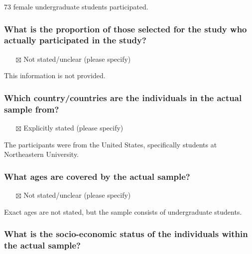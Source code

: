 \documentclass[
  doc, a4paper]{apa7}
\providecommand{\tightlist}{%
  \setlength{\itemsep}{0pt}\setlength{\parskip}{0pt}}
\begin{document}
73 female undergraduate students participated.

\subsubsection{What is the proportion of those selected for the study who actually participated in the study?}\label{what-is-the-proportion-of-those-selected-for-the-study-who-actually-participated-in-the-study}

\begin{itemize}
\tightlist
\item[$\boxtimes$]
  Not stated/unclear (please specify)
\end{itemize}

This information is not provided.

\subsubsection{Which country/countries are the individuals in the actual sample from?}\label{which-countrycountries-are-the-individuals-in-the-actual-sample-from}

\begin{itemize}
\tightlist
\item[$\boxtimes$]
  Explicitly stated (please specify)
\end{itemize}

The participants were from the United States, specifically students at Northeastern University.

\subsubsection{What ages are covered by the actual sample?}\label{what-ages-are-covered-by-the-actual-sample}

\begin{itemize}
\tightlist
\item[$\boxtimes$]
  Not stated/unclear (please specify)
\end{itemize}

Exact ages are not stated, but the sample consists of undergraduate students.

\subsubsection{What is the socio-economic status of the individuals within the actual sample?}\label{what-is-the-socio-economic-status-of-the-individuals-within-the-actual-sample}
\end{document}
